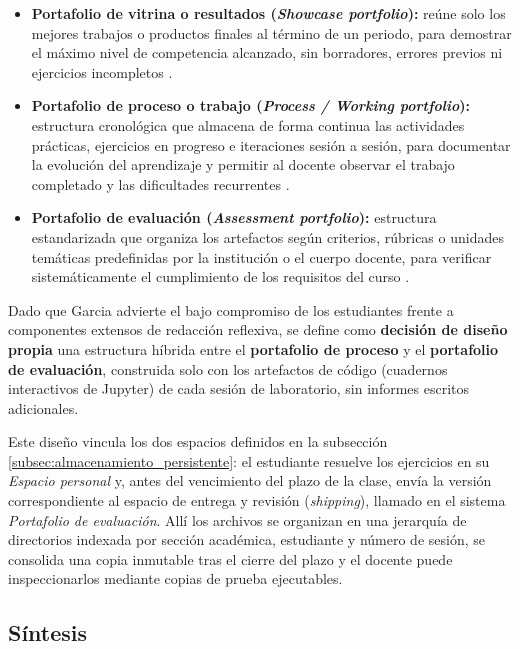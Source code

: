\begin{itemize}
    \item \textbf{Portafolio de vitrina o resultados (\textit{Showcase portfolio}):} reúne solo los mejores trabajos o productos finales al término de un periodo, para demostrar el máximo nivel de competencia alcanzado, sin borradores, errores previos ni ejercicios incompletos \cite{olstad2025eportfolios}.
    \item \textbf{Portafolio de proceso o trabajo (\textit{Process / Working portfolio}):} estructura cronológica que almacena de forma continua las actividades prácticas, ejercicios en progreso e iteraciones sesión a sesión, para documentar la evolución del aprendizaje y permitir al docente observar el trabajo completado y las dificultades recurrentes \cite{olstad2025eportfolios}.
    \item \textbf{Portafolio de evaluación (\textit{Assessment portfolio}):} estructura estandarizada que organiza los artefactos según criterios, rúbricas o unidades temáticas predefinidas por la institución o el cuerpo docente, para verificar sistemáticamente el cumplimiento de los requisitos del curso \cite{garcia2025portfolios}.
\end{itemize}

Dado que Garcia \cite{garcia2025portfolios} advierte el bajo compromiso de los estudiantes frente a componentes extensos de redacción reflexiva, se define como \textbf{decisión de diseño propia} una estructura híbrida entre el \textbf{portafolio de proceso} y el \textbf{portafolio de evaluación}, construida solo con los artefactos de código (cuadernos interactivos de Jupyter) de cada sesión de laboratorio, sin informes escritos adicionales.

Este diseño vincula los dos espacios definidos en la subsección \ref{subsec:almacenamiento_persistente}: el estudiante resuelve los ejercicios en su \textit{Espacio personal} y, antes del vencimiento del plazo de la clase, envía la versión correspondiente al espacio de entrega y revisión (\textit{shipping}), llamado en el sistema \textit{Portafolio de evaluación}. Allí los archivos se organizan en una jerarquía de directorios indexada por sección académica, estudiante y número de sesión, se consolida una copia inmutable tras el cierre del plazo y el docente puede inspeccionarlos mediante copias de prueba ejecutables.

\subsection{Síntesis}
\label{subsec:sintesis_marco}

